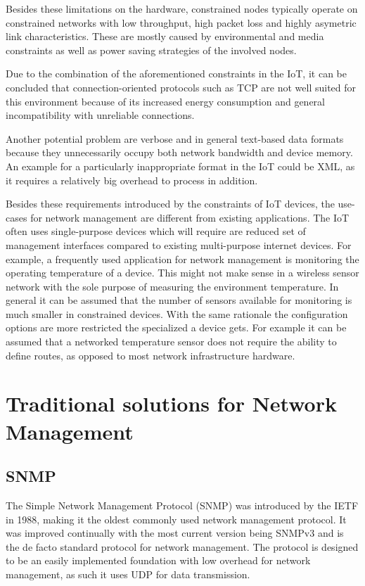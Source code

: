 \documentclass[conference]{IEEEtran}
\begin{document}
Besides these limitations on the hardware, constrained nodes typically operate on constrained networks with low throughput, high packet loss and highly asymetric link characteristics\cite{Ersue}. These are mostly caused by environmental and media constraints as well as power saving strategies of the involved nodes.

Due to the combination of the aforementioned constraints in the IoT, it can be concluded that connection-oriented protocols such as TCP are not well suited for this environment because of its increased energy consumption and general incompatibility with unreliable connections.

Another potential problem are verbose and in general text-based data formats because they unnecessarily occupy both network bandwidth and device memory.
An example for a particularly inappropriate format in the IoT could be XML, as it requires a relatively big overhead to process in addition.

Besides these requirements introduced by the constraints of IoT devices, the use-cases for network management are different from existing applications. The IoT often uses single-purpose devices which will require are reduced set of management interfaces compared to existing multi-purpose internet devices. For example, a frequently used application for network management is monitoring the operating temperature of a device. This might not make sense in a wireless sensor network with the sole purpose of measuring the environment temperature. In general it can be assumed that the number of sensors available for monitoring is much smaller in constrained devices. With the same rationale the configuration options are more restricted the specialized a device gets. For example it can be assumed that a networked temperature sensor does not require the ability to define routes, as opposed to most network infrastructure hardware.




\section{Traditional solutions for Network Management}
\label{sec:traditional-nm}
\subsection{SNMP} %
\label{sub:snmp}
The Simple Network Management Protocol (SNMP) was introduced by the IETF in 1988, making it the oldest commonly used network management protocol. It was improved continually with the most current version being SNMPv3\cite{rfc3411} and is the de facto standard protocol for network management. 
The protocol is designed to be an easily implemented foundation with low overhead for network management, as such it uses UDP for data transmission.
\end{document}
